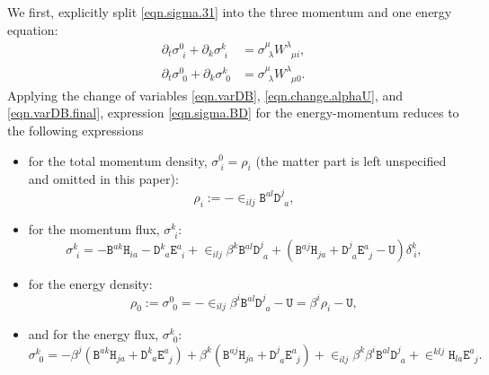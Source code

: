 \documentclass[
10pt, %
a4paper, %
oneside, %
headinclude,footinclude, %
BCOR5mm, %
]{scrartcl}
\newcommand{\pd}[1]{\partial_{#1}}
\newcommand{\Dfin}[2]{\mathtt{D}_{\phantom{#2}#1}^{#2}}	%
\newcommand{\Hfin}[2]{\mathtt{H}_{#2#1}}	%
\newcommand{\Efin}[2]{\mathtt{E}^{#1}_{\phantom{#1}#2}}	%
\newcommand{\Ufin}{\mathtt{U}}
\newcommand{\Bfin}[2]{\mathtt{B}^{#1#2}}	%
\newcommand{\w}[2]{W^{#1}_{\phantom{#1}#2}}
\newcommand{\EMmat}[2]{\sigma^{#1}_{\ \,#2}}
\newcommand{\LCsymb}{\bm{\in}}    %
\newcommand{\KD}[2]{\delta^{#1}_{\ #2}}
\begin{document}
We first, explicitly split \eqref{eqn.sigma.31} into the three momentum and one energy equation:
\begin{subequations}\label{eqn.EM.sigma}
	\begin{align}
		\pd{t}\EMmat{0}{i} + \pd{k}\EMmat{k}{i}
		& = \EMmat{\mu}{\lambda} 
		\w{\lambda}{\mu i},\\[2mm]
		\pd{t}\EMmat{0}{0} + \pd{k}\EMmat{k}{0}
		& = \EMmat{\mu}{\lambda} 
		\w{\lambda}{\mu 0}.
	\end{align}
\end{subequations}
Applying the change of variables \eqref{eqn.varDB}, \eqref{eqn.change.alphaU}, and 
\eqref{eqn.varDB.final}, expression \eqref{eqn.sigma.BD} for the energy-momentum reduces to the 
following expressions
\begin{itemize}
	\item 
	for the total momentum density, $ \sigma^0_{\ i} = \rho_i $ (the matter part is left 
	unspecified and omitted in this paper):
	\begin{equation}\label{eqn.sigma0i}
		\rho_i :=-\LCsymb_{ilj} \Bfin{a}{l}\Dfin{a}{j},
	\end{equation}
	\item
	for the momentum flux, $ \EMmat{k}{i}$:
	\begin{equation}\label{eqn.sigmaki}
		\EMmat{k}{i} = -\Bfin{a}{k} \Hfin{a}{i} - \Dfin{a}{k} \Efin{a}{i} + 
		\LCsymb_{ilj} 
		\beta^k \Bfin{a}{l}\Dfin{a}{j} + (\Bfin{a}{j} \Hfin{a}{j} + \Dfin{a}{j} \Efin{a}{j} 
		- \Ufin)\KD{k}{i},
	\end{equation}
	\item
	for the energy density:
	\begin{equation}\label{eqn.sigma00}
		\rho_0 :=\EMmat{0}{0} = - \LCsymb_{ilj} 
		\beta^i\Bfin{a}{l}\Dfin{a}{j} - \Ufin = \beta^i 
		\rho_i 
		- \Ufin,
	\end{equation}
	\item
	and for the energy flux, $ \EMmat{k}{0} $:
	\begin{equation}\label{eqn.sigmak0}
		{\EMmat{k}{0}} = -\beta^j( \Bfin{a}{k} \Hfin{a}{j} + \Dfin{a}{k} \Efin{a}{j})
		+
		\beta^k( \Bfin{a}{j} \Hfin{a}{j} + \Dfin{a}{j} \Efin{a}{j})
		+
		\LCsymb_{ilj}\beta^k\beta^i\Bfin{a}{l}\Dfin{a}{j}
		+
		\LCsymb^{klj} \Hfin{a}{l} \Efin{a}{j}.
	\end{equation}
\end{itemize}
\end{document}
